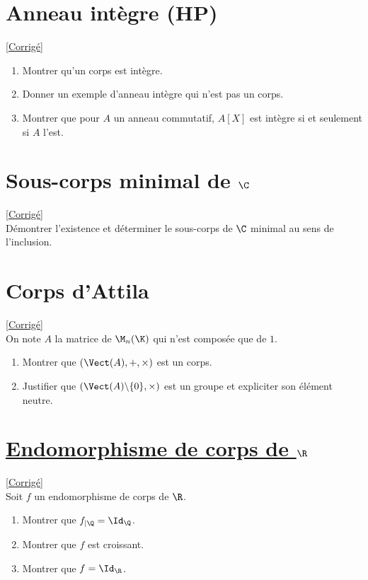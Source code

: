 \documentclass[8pt]{book}
\begin{document}
	\section{Anneau intègre  (HP)}
	\label{Anneau intègre}
	\textcolor{blue}{\hyperref[Anneau intègre corrigé]{[Corrigé]}}\\
	\begin{enumerate}[leftmargin=*]
		\item Montrer qu'un corps est intègre.
		\item Donner un exemple d'anneau intègre qui n'est pas un corps.
		\item Montrer que pour $A$ un anneau commutatif, $A[X]$ est intègre si et seulement si $A$ l'est.
	\end{enumerate}
	
	\section{Sous-corps minimal de $\C$ }
	\label{Sous-corps minimal de C}
	\textcolor{blue}{\hyperref[Sous-corps minimal de C corrigé]{[Corrigé]}}\\
	Démontrer l'existence et déterminer le sous-corps de $\C$ minimal au sens de l'inclusion.
	
	\section{Corps d'Attila}
	\label{Corps d'Attila}
	\textcolor{blue}{\hyperref[Corps d'Attila corrigé]{[Corrigé]}}\\
	On note $A$ la matrice de $\M_n(\K)$ qui n'est composée que de $1$.
	\begin{enumerate}
		\item Montrer que $(\Vect(A),+,\times)$ est un corps.
		\item Justifier que $(\Vect(A)\backslash\{0\},\times)$ est un groupe et expliciter son élément neutre.
	\end{enumerate}
	
	\section{\underline{Endomorphisme de corps de $\R$} }
	\label{Endomorphisme de corps de R}
	\textcolor{blue}{\hyperref[Endomorphisme de corps de R corrigé]{[Corrigé]}}\\
	Soit $f$ un endomorphisme de corps de $\R$.
	\begin{enumerate}
		\item Montrer que $f_{|\Q}=\Id_\Q$.
		\item Montrer que $f$ est croissant.
		\item Montrer que $f=\Id_\R$.
	\end{enumerate}
	
\end{document}
